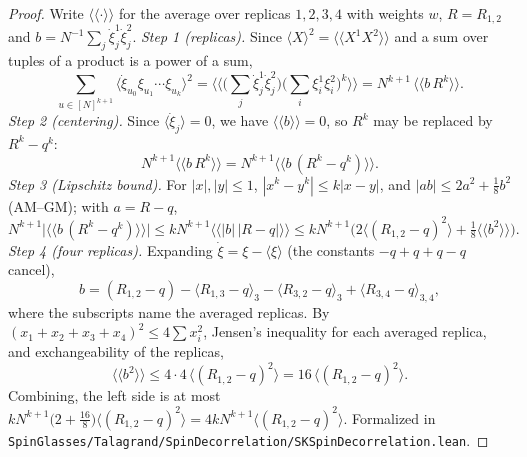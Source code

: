 \begin{proof}
\leanok
Write $\langle\!\langle\cdot\rangle\!\rangle$ for the average over replicas $1,2,3,4$ with weights $w$, $R=R_{1,2}$ and $b=N^{-1}\sum_j\dot\xi^1_j\dot\xi^2_j$.
\emph{Step 1 (replicas).} Since $\langle X\rangle^2=\langle\!\langle X^1X^2\rangle\!\rangle$ and a sum over tuples of a product is a power of a sum,
\[
\sum_{u\in[N]^{k+1}}\Big\langle\dot\xi_{u_0}\xi_{u_1}\cdots\xi_{u_k}\Big\rangle^2=\Big\langle\!\Big\langle\Big(\sum_j\dot\xi^1_j\dot\xi^2_j\Big)\Big(\sum_i\xi^1_i\xi^2_i\Big)^k\Big\rangle\!\Big\rangle=N^{k+1}\,\langle\!\langle b\,R^k\rangle\!\rangle .
\]
\emph{Step 2 (centering).} Since $\langle\dot\xi_j\rangle=0$, we have $\langle\!\langle b\rangle\!\rangle=0$, so $R^k$ may be replaced by $R^k-q^k$:
\[
N^{k+1}\langle\!\langle b\,R^k\rangle\!\rangle=N^{k+1}\langle\!\langle b\,(R^k-q^k)\rangle\!\rangle .
\]
\emph{Step 3 (Lipschitz bound).} For $|x|,|y|\le1$, $|x^k-y^k|\le k|x-y|$, and $|ab|\le2a^2+\frac18b^2$ (AM--GM); with $a=R-q$,
\[
N^{k+1}\big|\langle\!\langle b\,(R^k-q^k)\rangle\!\rangle\big|\le kN^{k+1}\langle\!\langle|b|\,|R-q|\rangle\!\rangle\le kN^{k+1}\Big(2\langle(R_{1,2}-q)^2\rangle+\tfrac18\langle\!\langle b^2\rangle\!\rangle\Big).
\]
\emph{Step 4 (four replicas).} Expanding $\dot\xi=\xi-\langle\xi\rangle$ (the constants $-q+q+q-q$ cancel),
\[
b=(R_{1,2}-q)-\langle R_{1,3}-q\rangle_3-\langle R_{3,2}-q\rangle_3+\langle R_{3,4}-q\rangle_{3,4},
\]
where the subscripts name the averaged replicas. By $(x_1+x_2+x_3+x_4)^2\le4\sum x_i^2$, Jensen's inequality for each averaged replica, and exchangeability of the replicas,
\[
\langle\!\langle b^2\rangle\!\rangle\le4\cdot4\,\langle(R_{1,2}-q)^2\rangle=16\,\langle(R_{1,2}-q)^2\rangle .
\]
Combining, the left side is at most $kN^{k+1}\big(2+\frac{16}8\big)\langle(R_{1,2}-q)^2\rangle=4kN^{k+1}\langle(R_{1,2}-q)^2\rangle$.
Formalized in \texttt{SpinGlasses/Talagrand/SpinDecorrelation/SKSpinDecorrelation.lean}.
\end{proof}


